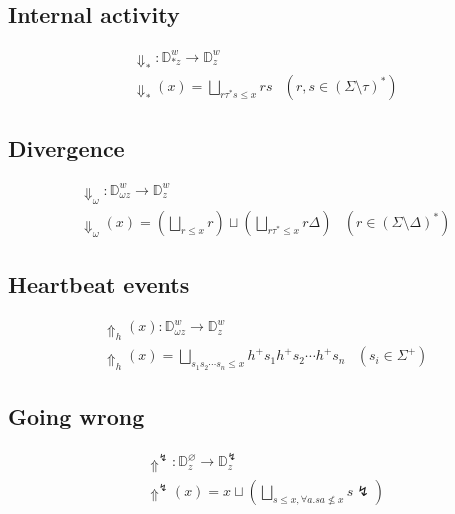 \documentclass[11pt]{article}
\begin{document}

%
%

\newpage

\subsection{Internal activity} %

\begin{align*}
  &{\Downarrow}_* : \mathbb{D}^w_{*z} \rightarrow \mathbb{D}^w_z \\
  &{\Downarrow}_*(x) = \bigsqcup_{r \tau^* s \le x} rs &
    (r, s \in (\Sigma \setminus \tau)^*)
\end{align*}


\subsection{Divergence} %

\begin{align*}
  &{\Downarrow}_\omega : \mathbb{D}^w_{\omega z} \rightarrow \mathbb{D}^w_z \\
  &{\Downarrow}_\omega(x) =
    \left( \bigsqcup_{r \le x} r \right) \sqcup
    \left( \bigsqcup_{r\tau^* \le x} r\Delta \right) &
    (r \in (\Sigma \setminus \Delta)^*)
\end{align*}


\subsection{Heartbeat events} %

\begin{align*}
  &{\Uparrow}_h(x) : \mathbb{D}^w_{\omega z} \rightarrow \mathbb{D}^w_z \\
  &{\Uparrow}_h(x) =
    \bigsqcup_{s_1 s_2 \cdots s_n \le x}
      h^+ s_1 h^+ s_2 \cdots h^+ s_n &
    (s_i \in \Sigma^+)
\end{align*}


\subsection{Going wrong} %

\begin{align*}
  &{\Uparrow}^\lightning :
    \mathbb{D}^\varnothing_z \rightarrow \mathbb{D}^\lightning_z \\
  &{\Uparrow}^\lightning(x) =
    x \sqcup
    \left( \bigsqcup_{s \le x, \forall a . sa \nleq x} s \lightning \right)
\end{align*}

\end{document}
